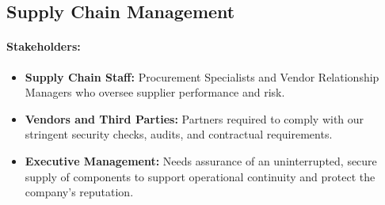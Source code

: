 \subsection{Supply Chain Management}

\paragraph{Stakeholders:}
\begin{itemize}
      \item \textbf{Supply Chain Staff:} Procurement Specialists and Vendor Relationship Managers who oversee supplier performance and risk.
      \item \textbf{Vendors and Third Parties:} Partners required to comply with our stringent security checks, audits, and contractual requirements.
      \item \textbf{Executive Management:} Needs assurance of an uninterrupted, secure supply of components to support operational continuity and protect the company’s reputation.
\end{itemize}

